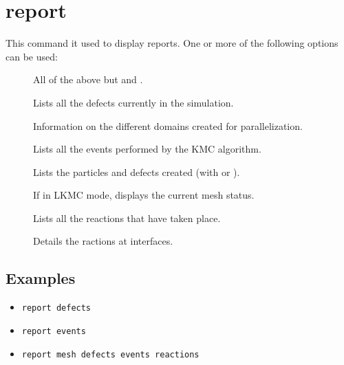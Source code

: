 \section{report}

This command it used to display reports. One or more of the following options can be used:

\begin{description}
\item[] All of the above but  and .
\item[] Lists all the defects currently in the simulation.
\item[] Information on the different domains created for parallelization.
\item[] Lists all the events performed by the KMC algorithm.
\item[] Lists the particles and defects created (with  or ).
\item[] If in LKMC mode, displays the current mesh status.
\item[] Lists all the reactions that have taken place.
\item[] Details the ractions at interfaces.
\end{description}

\subsection{Examples}
\begin{itemize}
\item \verb+report defects+
\item \verb+report events+
\item \verb+report mesh defects events reactions+
\end{itemize}

